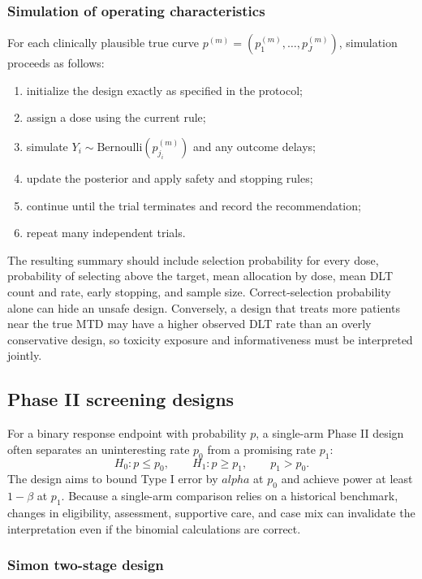 \documentclass[12pt,oneside]{book}
\numberwithin{equation}{section}
\theoremstyle{definition}
\theoremstyle{plain}
\theoremstyle{remark}
\newcommand{\Bern}{\mathrm{Bernoulli}}
\begin{document}
\subsubsection{Simulation of operating characteristics}

For each clinically plausible true curve
$p^{(m)}=(p_1^{(m)},\ldots,p_J^{(m)})$, simulation proceeds as follows:
\begin{enumerate}
    \item initialize the design exactly as specified in the protocol;
    \item assign a dose using the current rule;
    \item simulate $Y_i\sim\Bern(p_{j_i}^{(m)})$ and any outcome delays;
    \item update the posterior and apply safety and stopping rules;
    \item continue until the trial terminates and record the recommendation;
    \item repeat many independent trials.
\end{enumerate}
The resulting summary should include selection probability for every dose,
probability of selecting above the target, mean allocation by dose, mean DLT
count and rate, early stopping, and sample size.  Correct-selection probability
alone can hide an unsafe design.  Conversely, a design that treats more patients
near the true MTD may have a higher observed DLT rate than an overly conservative
design, so toxicity exposure and informativeness must be interpreted jointly.

\subsection{Phase II screening designs}

For a binary response endpoint with probability $p$, a single-arm Phase II
design often separates an uninteresting rate $p_0$ from a promising rate $p_1$:
\[
 H_0:p\leq p_0,
 \qquad
 H_1:p\geq p_1,
 \qquad p_1>p_0.
\]
The design aims to bound Type I error by $alpha$ at $p_0$ and achieve power at
least $1-\beta$ at $p_1$.  Because a single-arm comparison relies on a historical
benchmark, changes in eligibility, assessment, supportive care, and case mix can
invalidate the interpretation even if the binomial calculations are correct.

\subsubsection{Simon two-stage design}
\end{document}
